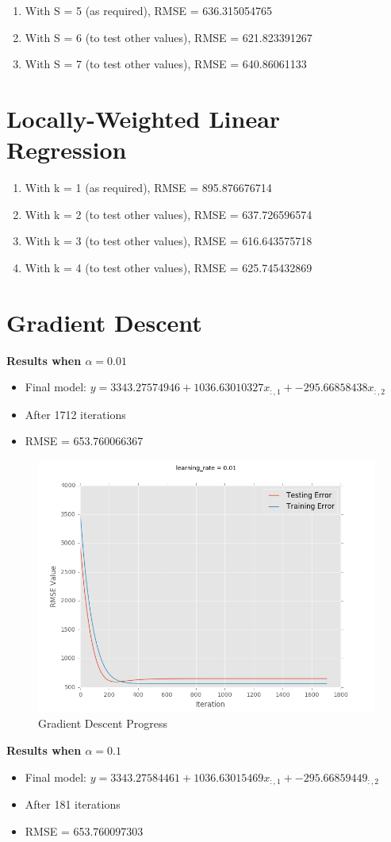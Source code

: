 \documentclass[12pt]{article}
\begin{document}
\begin{enumerate}
\item With S = 5 (as required), RMSE = 636.315054765
\item With S = 6 (to test other values), RMSE = 621.823391267
\item With S = 7 (to test other values), RMSE = 640.86061133
\end{enumerate}

\section{Locally-Weighted Linear Regression}
\begin{enumerate}
\item With k = 1 (as required), RMSE = 895.876676714
\item With k = 2 (to test other values), RMSE = 637.726596574
\item With k = 3 (to test other values), RMSE = 616.643575718
\item With k = 4 (to test other values), RMSE = 625.745432869
\end{enumerate}


\newpage
\section{Gradient Descent}

\textbf{Results when $\alpha=0.01$}
\begin{itemize}
\item Final model: $y = 3343.27574946 + 1036.63010327x_{:,1} + -295.66858438x_{:,2}$
\item After 1712 iterations
\item RMSE = 653.760066367
\end{itemize}

\begin{figure}[H]
\begin{center}
\includegraphics{gradient_descent_errors.png}
\caption{Gradient Descent Progress}
\label{GD}
\end{center}
\end{figure}

\textbf{Results when $\alpha=0.1$}
\begin{itemize}
\item Final model: $y = 3343.27584461 + 1036.63015469x_{:,1} + -295.66859449_{:,2}$
\item After 181 iterations
\item RMSE = 653.760097303
\end{itemize}
\end{document}
